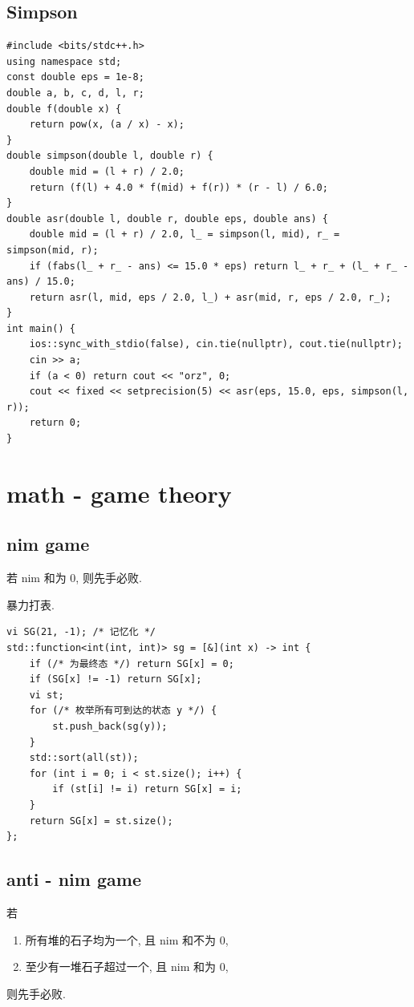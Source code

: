 \documentclass[UTF8, a4paper, titlepage, twoside]{ctexart}
\begin{document}
\subsection{ Simpson }
\begin{lstlisting}[style=cpp]
#include <bits/stdc++.h>
using namespace std;
const double eps = 1e-8;
double a, b, c, d, l, r;
double f(double x) {
    return pow(x, (a / x) - x);
}
double simpson(double l, double r) {
    double mid = (l + r) / 2.0;
    return (f(l) + 4.0 * f(mid) + f(r)) * (r - l) / 6.0;
}
double asr(double l, double r, double eps, double ans) {
    double mid = (l + r) / 2.0, l_ = simpson(l, mid), r_ = simpson(mid, r);
    if (fabs(l_ + r_ - ans) <= 15.0 * eps) return l_ + r_ + (l_ + r_ - ans) / 15.0;
    return asr(l, mid, eps / 2.0, l_) + asr(mid, r, eps / 2.0, r_);
}
int main() {
    ios::sync_with_stdio(false), cin.tie(nullptr), cout.tie(nullptr);
    cin >> a;
    if (a < 0) return cout << "orz", 0;
    cout << fixed << setprecision(5) << asr(eps, 15.0, eps, simpson(l, r));
    return 0;
}
\end{lstlisting}

\newpage
\section{ math - game theory }
\subsection{ nim game }
若 nim 和为 0, 则先手必败.

暴力打表.
\begin{lstlisting}[style=cpp]
vi SG(21, -1); /* 记忆化 */
std::function<int(int, int)> sg = [&](int x) -> int {
    if (/* 为最终态 */) return SG[x] = 0;
    if (SG[x] != -1) return SG[x];
    vi st;
    for (/* 枚举所有可到达的状态 y */) {
        st.push_back(sg(y));
    }
    std::sort(all(st));
    for (int i = 0; i < st.size(); i++) {
        if (st[i] != i) return SG[x] = i;
    }
    return SG[x] = st.size();
};
\end{lstlisting}

\subsection{ anti - nim game }
若
\begin{enumerate}
    \item 所有堆的石子均为一个, 且 nim 和不为 0, 
    \item 至少有一堆石子超过一个, 且 nim 和为 0,
\end{enumerate}
则先手必败.
\end{document}
